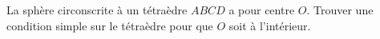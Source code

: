 La sphère circonscrite à un tétraèdre $ABCD$ a pour centre $O$. Trouver une condition simple sur le tétraèdre pour que $O$ soit à l'intérieur.
